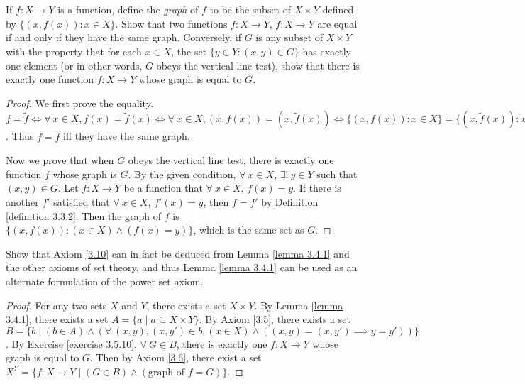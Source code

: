 \begin{exercise}\label{exercise 3.5.10}
If \(f : X \to Y\) is a function, define the \emph{graph} of \(f\) to be the subset of \(X \times Y\) defined by \(\{(x, f(x)) : x \in X\}\).
Show that two functions \(f : X \to Y\), \(\tilde{f} : X \to Y\) are equal if and only if they have the same graph.
Conversely, if \(G\) is any subset of \(X \times Y\) with the property that for each \(x \in X\), the set \(\{y \in Y : (x, y) \in G\}\) has exactly one element (or in other words, \(G\) obeys the vertical line test), show that there is exactly one function \(f : X \to Y\) whose graph is equal to \(G\).
\end{exercise}

\begin{proof}
We first prove the equality.
\(f = \tilde{f} \iff \forall\ x \in X, f(x) = \tilde{f}(x) \iff \forall\ x \in X, (x, f(x)) = (x, \tilde{f}(x)) \iff \{(x, f(x)) : x \in X\} = \{(x, \tilde{f}(x)) : x \in X\}\).
Thus \(f = \tilde{f}\) iff they have the same graph.

Now we prove that when \(G\) obeys the vertical line test, there is exactly one function \(f\) whose graph is \(G\).
By the given condition, \(\forall\ x \in X\), \(\exists!\ y \in Y\) such that \((x, y) \in G\).
Let \(f : X \to Y\) be a function that \(\forall\ x \in X\), \(f(x) = y\).
If there is another \(f'\) satisfied that \(\forall\ x \in X\), \(f'(x) = y\), then \(f = f'\) by Definition \ref{definition 3.3.2}.
Then the graph of \(f\) is \(\{(x, f(x)) : (x \in X) \land (f(x) = y)\}\), which is the same set as \(G\).
\end{proof}

\begin{exercise}\label{exercise 3.5.11}
Show that Axiom \ref{3.10} can in fact be deduced from Lemma \ref{lemma 3.4.1} and the other axioms of set theory, and thus Lemma \ref{lemma 3.4.1} can be used as an alternate formulation of the power set axiom.
\end{exercise}

\begin{proof}
For any two sets \(X\) and \(Y\), there exists a set \(X \times Y\).
By Lemma \ref{lemma 3.4.1}, there exists a set \(A = \{a \mid a \subseteq X \times Y\}\).
By Axiom \ref{3.5}, there exists a set \(B = \{b \mid (b \in A) \land (\forall\ (x, y), (x, y') \in b, (x \in X) \land ((x, y) = (x, y') \implies y = y'))\}\).
By Exercise \ref{exercise 3.5.10}, \(\forall\ G \in B\), there is exactly one \(f : X \to Y\) whose graph is equal to \(G\).
Then by Axiom \ref{3.6}, there exist a set \(X^Y = \{f : X \to Y \mid (G \in B) \land (\text{graph of } f = G)\}\).
\end{proof}


